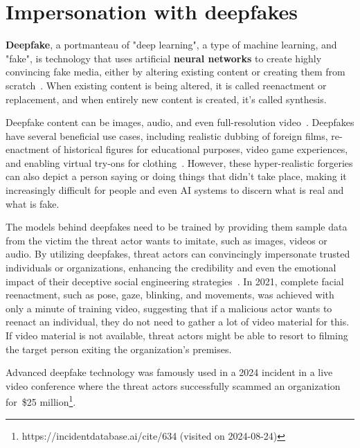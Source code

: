 \section{Impersonation with deepfakes}
\begin{comment}
\end{comment}

%
%
\textbf{Deepfake}, a portmanteau of "deep learning", a type of machine learning, and "fake", is technology that uses artificial \textbf{neural networks} to create highly convincing fake media, either by altering existing content or creating them from scratch~\citep{mirsky_Creation_Detection_Deepfakes_2021}. When existing content is being altered, it is called reenactment or replacement, and when entirely new content is created, it's called synthesis.

%
%
Deepfake content can be images, audio, and even full-resolution video~\citep{blauth_AI_Crime_Overview_Malicious_Use_Abuse_2022}. Deepfakes have several beneficial use cases, including realistic dubbing of foreign films, re-enactment of historical figures for educational purposes, video game experiences, and enabling virtual try-ons for clothing~\citep{mirsky_Creation_Detection_Deepfakes_2021}. However, these hyper-realistic forgeries can also depict a person saying or doing things that didn't take place, making it increasingly difficult for people and even AI systems to discern what is real and what is fake. 

%
%
The models behind deepfakes need to be trained by providing them sample data from the victim the threat actor wants to imitate, such as images, videos or audio. By utilizing deepfakes, threat actors can convincingly impersonate trusted individuals or organizations, enhancing the credibility and even the emotional impact of their deceptive social engineering strategies~\citep{mirsky_Creation_Detection_Deepfakes_2021}. In 2021, complete facial reenactment, such as pose, gaze, blinking, and movements, was achieved with only a minute of training video, suggesting that if a malicious actor wants to reenact an individual, they do not need to gather a lot of video material for this. If video material is not available, threat actors might be able to resort to filming the target person exiting the organization's premises. 


Advanced deepfake technology was famously used in a 2024 incident in a live video conference where the threat actors successfully scammed an organization for~\$25 million\footnote{https://incidentdatabase.ai/cite/634 (visited on 2024-08-24)}.%




